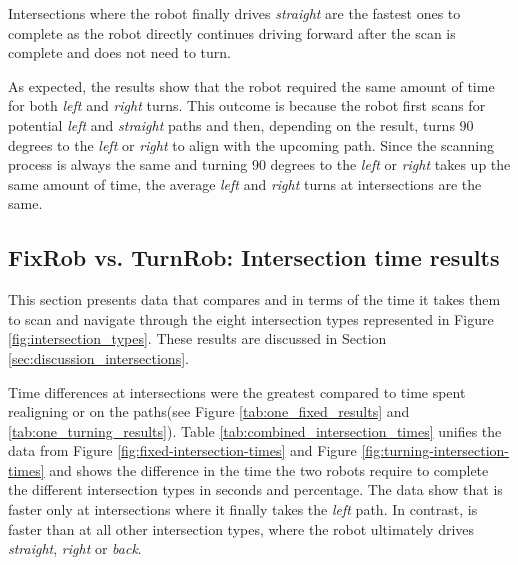 Intersections where the robot finally drives \textit{straight} are the fastest ones to complete as the robot directly continues driving forward after the scan is complete and does not need to turn.

As expected, the results show that the robot required the same amount of time for both \textit{left} and \textit{right} turns. This outcome is because the robot first scans for potential \textit{left} and \textit{straight} paths and then, depending on the result, turns 90 degrees to the \textit{left} or \textit{right} to align with the upcoming path. Since the scanning process is always the same and turning 90 degrees to the \textit{left} or \textit{right} takes up the same amount of time, the average \textit{left} and \textit{right} turns at intersections are the same.


\subsection{FixRob vs. TurnRob: Intersection time results}\label{sec:fixrob_vs_turnrob}

This section presents data that compares \FixRob and \TurnRob in terms of the time it takes them to scan and navigate through the eight intersection types represented in Figure \ref{fig:intersection_types}. These results are discussed in Section \ref{sec:discussion_intersections}.

Time differences at intersections were the greatest compared to time spent realigning or on the paths(see Figure \ref{tab:one_fixed_results} and \ref{tab:one_turning_results}). Table \ref{tab:combined_intersection_times} unifies the data from Figure \ref{fig:fixed-intersection-times} and Figure \ref{fig:turning-intersection-times} and shows the difference in the time the two robots require to complete the different intersection types in seconds and percentage. The data show that \FixRob is faster only at intersections where it finally takes the \textit{left} path. In contrast, \TurnRob is faster than \FixRob at all other intersection types, where the robot ultimately drives \textit{straight}, \textit{right} or \textit{back}.


